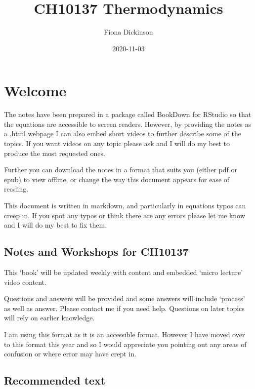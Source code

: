 \documentclass[
]{book}
\title{CH10137 Thermodynamics}
\author{Fiona Dickinson}
\date{2020-11-03}
\begin{document}
\maketitle

{
\setcounter{tocdepth}{1}
\tableofcontents
}
\hypertarget{welcome}{%
\chapter*{Welcome}\label{welcome}}

The notes have been prepared in a package called BookDown for RStudio so that the equations are accessible to screen readers. However, by providing the notes as a .html webpage I can also embed short videos to further describe some of the topics. If you want videos on any topic please ask and I will do my best to produce the most requested ones.

Further you can download the notes in a format that suits you (either pdf or epub) to view offline, or change the way this document appears for ease of reading.

This document is written in markdown, and particularly in equations typos can creep in. If you spot any typos or think there are any errors please let me know and I will do my best to fix them.

\hypertarget{notes-and-workshops-for-ch10137}{%
\section*{Notes and Workshops for CH10137}\label{notes-and-workshops-for-ch10137}}

This `book' will be updated weekly with content and embedded `micro lecture' video content.

Questions and answers will be provided and some answers will include `process' as well as answer. Please contact me if you need help. Questions on later topics will rely on earlier knowledge.

I am using this format as it is an accessible format. However I have moved over to this format this year and so I would appreciate you pointing out any areas of confusion or where error may have crept in.

\hypertarget{recommended-text}{%
\section*{Recommended text}\label{recommended-text}}
\end{document}
